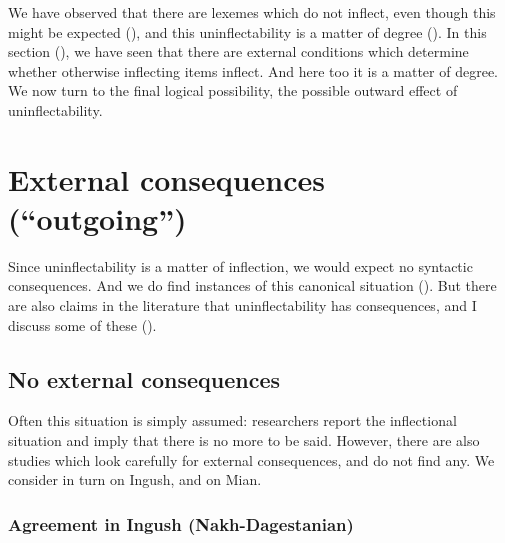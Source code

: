 \documentclass[output=paper]{langscibook}
\begin{document}
We have observed that there are lexemes which do not inflect, even though this might be expected (), and this uninflectability is a matter of degree (). In this section (), we have seen that there are external conditions which determine whether otherwise inflecting items inflect. And here too it is a matter of degree. We now turn to the final logical possibility, the possible outward effect of uninflectability. 

\section{\textbf{External} \textbf{consequences} \textbf{(“outgoing”)}}

Since uninflectability is a matter of inflection, we would expect no syntactic consequences. And we do find instances of this canonical situation (). But there are also claims in the literature that uninflectability has consequences, and I discuss some of these ().

\subsection{\textbf{No} \textbf{external} \textbf{consequences}}

Often this situation is simply assumed: researchers report the inflectional situation and imply that there is no more to be said. However, there are also studies which look carefully for external consequences, and do not find any. We consider in turn \citet{Nichols2018} on Ingush, and \citet{Fedden2022} on Mian.

\subsubsection{\textbf{Agreement} \textbf{in} \textbf{Ingush} \textbf{(Nakh-Dagestanian)}}
\end{document}
